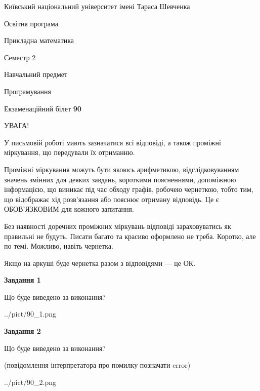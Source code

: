 \documentclass[12pt, ukrainian]{article}
\begin{document}
{{\begin {small}\par
{ \center  Київський національний університет імені Тараса Шевченка \par}
{\parbox {5 cm}{Освітня програма \hfill}{\parbox {7 cm}{Прикладна математика\hfill}}\parbox {6 cm}{\hfill Семестр 2}}\par
{\parbox {5 cm} {Навчальний предмет \hfill}\parbox {7 cm}{Програмування \hfill}\parbox {6cm}{\hfill}\par}\vspace{-7pt} \end{small}}{\center Екзаменаційний білет \No \textbf
{ 90 }\par}}
{
\begin {large}
УВАГА!

У письмовій роботі мають зазначатися всі відповіді, а також проміжні міркування, що передували їх отриманню.

Проміжні міркування можуть бути якоюсь арифметикою, відслідковуванням зна\-чень змінних для деяких завдань,
короткими поясненнями, допоміжною інформацією, що виникає під час обходу графів, робочею чернеткою,
тобто тим, що відображає хід розв’язання або пояснює отриману відповідь.
Це є ОБОВ’ЯЗКОВИМ для кожного запитання.

Без наявності доречних проміжних міркувань відповіді зараховуватись як правиль\-ні не будуть.
Писати багато та красиво оформлено не треба. Коротко, але по темі. Можли\-во, навіть чернетка.

Якщо на аркуші буде чернетка разом з відповідями --- це ОК.

\newpage

{\begin {center}\textbf{Завдання 1}\end {center}}\par
Що буде виведено за виконання?\par
\begin{center}
	{../pict/90_1.png}
\end{center}
\newpage

{\begin {center}\textbf{Завдання 2}\end {center}}\par
Що буде виведено за виконання?\par
 (повідомлення інтерпретатора про помилку позначати error)\par
\begin{center}
	{../pict/90_2.png}
\end{center}
\newpage


\end{large}}
\end{document}
